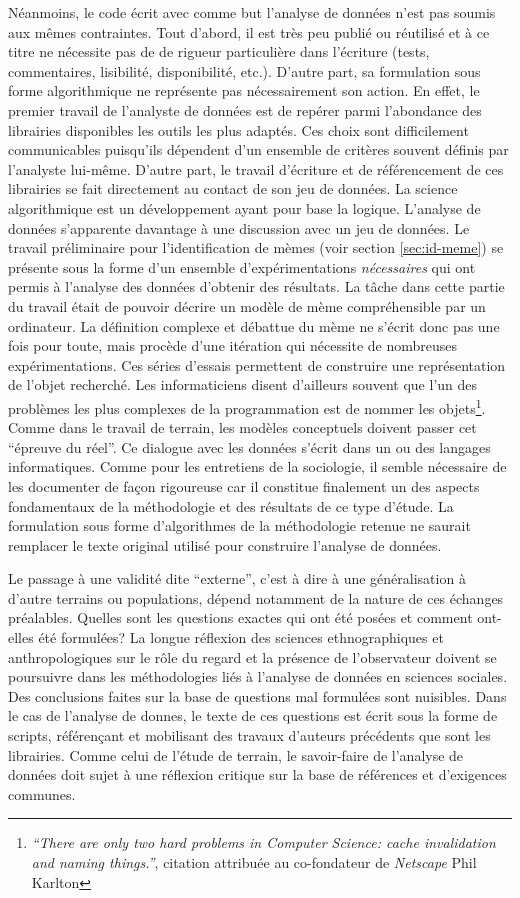 Néanmoins, le code écrit avec comme but l'analyse de données n'est pas soumis aux mêmes contraintes. Tout d'abord, il est très peu publié ou réutilisé et à ce titre ne nécessite pas de de rigueur particulière dans l'écriture (tests, commentaires, lisibilité, disponibilité, etc.). D'autre part, sa formulation sous forme algorithmique ne représente pas nécessairement son action. En effet, le premier travail de l'analyste de données est de repérer parmi l'abondance des librairies disponibles les outils les plus adaptés. Ces choix sont difficilement communicables puisqu'ils dépendent d'un ensemble de critères souvent définis par l'analyste lui-même. D'autre part, le travail d'écriture et de référencement de ces librairies se fait directement au contact de son jeu de données. La science algorithmique est un développement ayant pour base la logique. L'analyse de données s'apparente davantage à une discussion avec un jeu de données. Le travail préliminaire pour l'identification de mèmes (voir section \ref{sec:id-meme}) se présente sous la forme d'un ensemble d'expérimentations \textit{nécessaires} qui ont permis à l'analyse des données d'obtenir des résultats. La tâche dans cette partie du travail était de pouvoir décrire un modèle de mème compréhensible par un ordinateur. La définition complexe et débattue du mème ne s'écrit donc pas une fois pour toute, mais procède d'une itération qui nécessite de nombreuses expérimentations. Ces séries d'essais permettent de construire une représentation de l'objet recherché. Les informaticiens disent d'ailleurs souvent que l'un des problèmes les plus complexes de la programmation est de nommer les objets\footnote{\textit{``There are only two hard problems in Computer Science: cache invalidation and naming things.''}, citation attribuée au co-fondateur de \textit{Netscape} Phil Karlton}. Comme dans le travail de terrain, les modèles conceptuels doivent passer cet ``épreuve du réel''. Ce dialogue avec les données s'écrit dans un ou des langages informatiques. Comme pour les entretiens de la sociologie, il semble nécessaire de les documenter de façon rigoureuse car il constitue finalement un des aspects fondamentaux de la méthodologie et des résultats de ce type d'étude. La formulation sous forme d'algorithmes de la méthodologie retenue ne saurait remplacer le texte original utilisé pour construire l'analyse de données. 

Le passage à une validité dite ``externe'', c'est à dire à une généralisation à d'autre terrains ou populations, dépend notamment de la nature de ces échanges préalables. Quelles sont les questions exactes qui ont été posées et comment ont-elles été formulées? La longue réflexion des sciences ethnographiques et anthropologiques sur le rôle du regard et la présence de l'observateur doivent se poursuivre dans les méthodologies liés à l'analyse de données en sciences sociales. Des conclusions faites sur la base de questions mal formulées sont nuisibles. Dans le cas de l'analyse de donnes, le texte de ces questions est écrit sous la forme de scripts, référençant et mobilisant des travaux d'auteurs précédents que sont les librairies. Comme celui de l'étude de terrain, le savoir-faire de l'analyse de données doit sujet à une réflexion critique sur la base de références et d'exigences communes.

